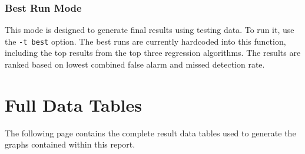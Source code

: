 \documentclass{acm_proc_article-sp}
\begin{document}
\subsubsection{Best Run Mode}
This mode is designed to generate final results using testing data. To run it, use the \verb|-t best| option. The best runs are currently hardcoded into this function, including the top results from the top three regression algorithms. The results are ranked based on lowest combined false alarm and missed detection rate.

\section{Full Data Tables}
The following page contains the complete result data tables used to generate the graphs contained within this report.
\balancecolumns










\end{document}
